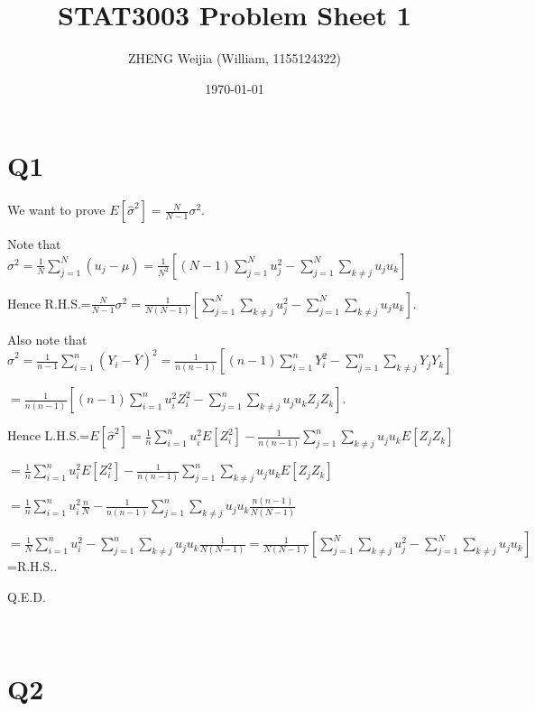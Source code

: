 \documentclass[12pt]{article}%
\begin{document}
\title{STAT3003 Problem Sheet 1}
\author{ZHENG Weijia (William, 1155124322)}
\date{\today}
\maketitle



\section{Q1}

We want to prove $E[\hat{\sigma}^2]=\frac{N}{N-1}\sigma^2.$

Note that $\sigma^2=\frac{1}{N}\sum_{j=1}^{N}(u_j-\mu)=\frac{1}{N^2}[(N-1)\sum_{j=1}^{N}u_j^2-\sum_{j=1}^{N}\sum_{k\neq j}u_ju_k]$

Hence R.H.S.=$\frac{N}{N-1}\sigma^2=\frac{1}{N(N-1)}[\sum_{j=1}^{N}\sum_{k\neq j}u_j^2-\sum_{j=1}^{N}\sum_{k\neq j}u_ju_k].$

Also note that $\hat{\sigma}^2=\frac{1}{n-1}\sum_{i=1}^{n}(Y_i-\bar{Y})^2=\frac{1}{n(n-1)}[(n-1)\sum_{i=1}^{n}Y_i^2-\sum_{j=1}^{n}\sum_{k\neq j}Y_jY_k]$

$=\frac{1}{n(n-1)}[(n-1)\sum_{i=1}^{n}u_i^2Z_i^2-\sum_{j=1}^{n}\sum_{k\neq j}u_ju_kZ_jZ_k].$

Hence L.H.S.=$E[\hat{\sigma}^2]=\frac{1}{n}\sum_{i=1}^{n}u_i^2E[Z_i^2]-\frac{1}{n(n-1)}\sum_{j=1}^{n}\sum_{k\neq j}u_ju_kE[Z_jZ_k]$

$=\frac{1}{n}\sum_{i=1}^{n}u_i^2E[Z_i^2]-\frac{1}{n(n-1)}\sum_{j=1}^{n}\sum_{k\neq j}u_ju_kE[Z_jZ_k]$

$=\frac{1}{n}\sum_{i=1}^{n}u_i^2\frac{n}{N}-\frac{1}{n(n-1)}\sum_{j=1}^{n}\sum_{k\neq j}u_ju_k\frac{n(n-1)}{N(N-1)}$

$=\frac{1}{N}\sum_{i=1}^{n}u_i^2-\sum_{j=1}^{n}\sum_{k\neq j}u_ju_k\frac{1}{N(N-1)}=\frac{1}{N(N-1)}[\sum_{j=1}^{N}\sum_{k\neq j}u_j^2-\sum_{j=1}^{N}\sum_{k\neq j}u_ju_k]$=R.H.S..

Q.E.D.

~\ 

\section{Q2}
\end{document}
